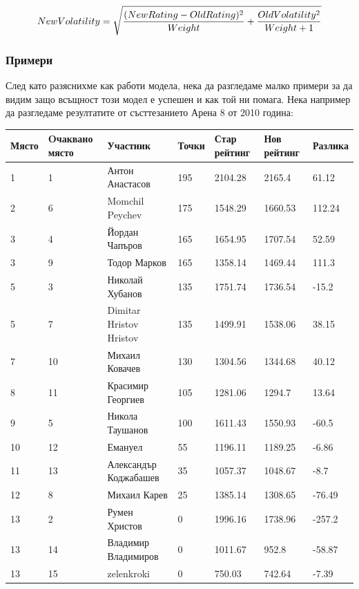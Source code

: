 \documentclass[a4paper,12pt]{article}
\begin{document}
  \begin{equation}
    NewVolatility=\sqrt{\\
    \frac{(NewRating - OldRating)^2}{Weight}\\
    +\\
    \frac{OldVolatility^2}{Weight + 1}\\
    }
  \end{equation}
  
  \subsubsection{Примери}
  След като разяснихме как работи модела, нека да разгледаме малко примери за да видим защо всъщност този модел е успешен и как той ни помага.
  Нека например да разгледаме резултатите от състтезанието Арена 8 от 2010 година:
  {\tiny
    \begin{center}
      \begin{tabular}{ | l | l | l | l | l | l | l |}
        \hline
        Място & Oчаквано място & Участник & Точки & Стар рейтинг & Нов рейтинг & Разлика \\ \hline
        1 & 1 & Антон Анастасов & 195 & 2104.28 & 2165.4 & 61.12 \\
        2 & 6 & Momchil Peychev & 175 & 1548.29 & 1660.53 & 112.24 \\
        3 & 4 & Йордан Чапъров & 165 & 1654.95 & 1707.54 & 52.59 \\
        3 & 9 & Тодор Марков & 165 & 1358.14 & 1469.44 & 111.3 \\
        5 & 3 & Николай Хубанов & 135 & 1751.74 & 1736.54 & -15.2 \\
        5 & 7 & Dimitar Hristov Hristov & 135 & 1499.91 & 1538.06 & 38.15 \\
        7 & 10 & Михаил Ковачев & 130 & 1304.56 & 1344.68 & 40.12 \\
        8 & 11 & Красимир Георгиев & 105 & 1281.06 & 1294.7 & 13.64 \\
        9 & 5 & Никола Таушанов & 100 & 1611.43 & 1550.93 & -60.5 \\
        10 & 12 & Емануел & 55 & 1196.11 & 1189.25 & -6.86 \\
        11 & 13 & Александър Коджабашев & 35 & 1057.37 & 1048.67 & -8.7 \\
        12 & 8 & Михаил Карев & 25 & 1385.14 & 1308.65 & -76.49 \\
        13 & 2 & Румен Христов & 0 & 1996.16 & 1738.96 & -257.2 \\
        13 & 14 & Владимир Владимиров & 0 & 1011.67 & 952.8 & -58.87 \\
        13 & 15 & zelenkroki & 0 & 750.03 & 742.64 & -7.39 \\
        \hline
      \end{tabular}
    \end{center}
  }
  
\end{document}
